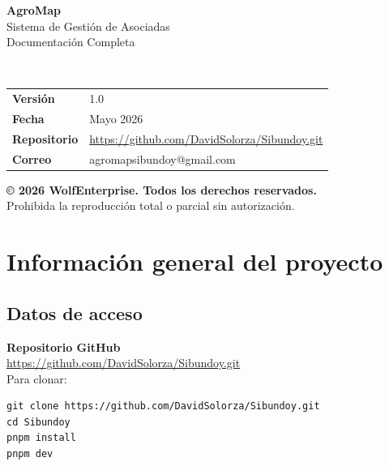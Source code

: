 \documentclass[12pt]{article}
\begin{document}
\begin{titlepage}
  \centering
  \vspace*{3cm}
  {\Huge\bfseries\color{primary} AgroMap \\[0.5em]}
  {\LARGE\color{gray} Sistema de Gesti\'on de Asociadas \\[1.5em]}
  {\large\color{gray} Documentaci\'on Completa \\[0.5em]}
  \vspace{1.5cm}
  \begin{tcolorbox}[colback=primary!90, colframe=primary, arc=10pt, width=0.7\textwidth, center]
    \centering\textcolor{white}{\large\textbf{Software desarrollado por WolfEnterprise}}
  \end{tcolorbox}
  \vspace{1cm}
  \begin{tabular}{ll}
    \textbf{Versi\'on} & 1.0 \\
    \textbf{Fecha} & Mayo 2026 \\
    \textbf{Repositorio} & \url{https://github.com/DavidSolorza/Sibundoy.git} \\
    \textbf{Correo} & agromapsibundoy@gmail.com \\
  \end{tabular}
  \vfill
  \small{\textbf{\copyright{} 2026 WolfEnterprise. Todos los derechos reservados.}\\ Prohibida la reproducci\'on total o parcial sin autorizaci\'on.}
\end{titlepage}

\newpage
\tableofcontents
\newpage

\section{Informaci\'on general del proyecto}

\subsection{Datos de acceso}

\begin{credbox}
  \textbf{Repositorio GitHub}\\[0.3em]
  \url{https://github.com/DavidSolorza/Sibundoy.git}\\[0.3em]
  Para clonar:
  \begin{lstlisting}[style=bashstyle]
git clone https://github.com/DavidSolorza/Sibundoy.git
cd Sibundoy
pnpm install
pnpm dev
  \end{lstlisting}
\end{credbox}
\end{document}
